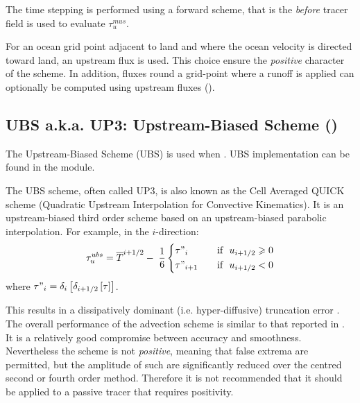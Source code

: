 \documentclass[../tex_main/NEMO_manual]{subfiles}
\begin{document}
The time stepping is performed using a forward scheme,
that is the \textit{before} tracer field is used to evaluate $\tau _u^{mus}$.

For an ocean grid point adjacent to land and where the ocean velocity is directed toward land,
an upstream flux is used.
This choice ensure the \textit{positive} character of the scheme.
In addition, fluxes round a grid-point where a runoff is applied can optionally be computed using upstream fluxes
().

\subsection{UBS a.k.a. UP3: Upstream-Biased Scheme (\protect{})}
\label{subsec:TRA_adv_ubs}

The Upstream-Biased Scheme (UBS) is used when .
UBS implementation can be found in the  module.

The UBS scheme, often called UP3, is also known as the Cell Averaged QUICK scheme
(Quadratic Upstream Interpolation for Convective Kinematics).
It is an upstream-biased third order scheme based on an upstream-biased parabolic interpolation.
For example, in the $i$-direction:
\begin{equation} \label{eq:tra_adv_ubs}
   \tau _u^{ubs} =\overline T ^{i+1/2}-\;\frac{1}{6} \left\{      
   \begin{aligned}
         &\tau"_i        	& \quad \text{if }\ u_{i+1/2} \geqslant 0      \\
         &\tau"_{i+1}	& \quad \text{if }\ u_{i+1/2}       <       0
   \end{aligned}    \right.
\end{equation}
where $\tau "_i =\delta _i \left[ {\delta _{i+1/2} \left[ \tau \right]} \right]$.

This results in a dissipatively dominant (i.e. hyper-diffusive) truncation error
\citep{Shchepetkin_McWilliams_OM05}.
The overall performance of the advection scheme is similar to that reported in \cite{Farrow1995}.
It is a relatively good compromise between accuracy and smoothness.
Nevertheless the scheme is not \emph{positive}, meaning that false extrema are permitted,
but the amplitude of such are significantly reduced over the centred second or fourth order method.
Therefore it is not recommended that it should be applied to a passive tracer that requires positivity.
\end{document}

